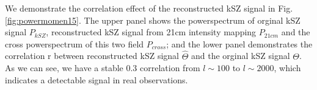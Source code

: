 We demonstrate the correlation effect of the reconstructed kSZ signal in Fig.\ref{fig:powermomen15}. The upper panel shows the powerspectrum of orginal kSZ signal $P_{kSZ}$, reconstructed kSZ signal from 21cm intensity mapping $P_{21cm}$ and the cross powerspectrum of this two field $P_{cross}$; 
and the lower panel demonstrates the correlation r between reconstructed kSZ signal $\hat\Theta$ and the orginal kSZ signal $\Theta$. 
As we can see, we have a stable 0.3 correlation from $l\sim 100$ to $l\sim 2000$, which indicates a detectable signal in real observations.

